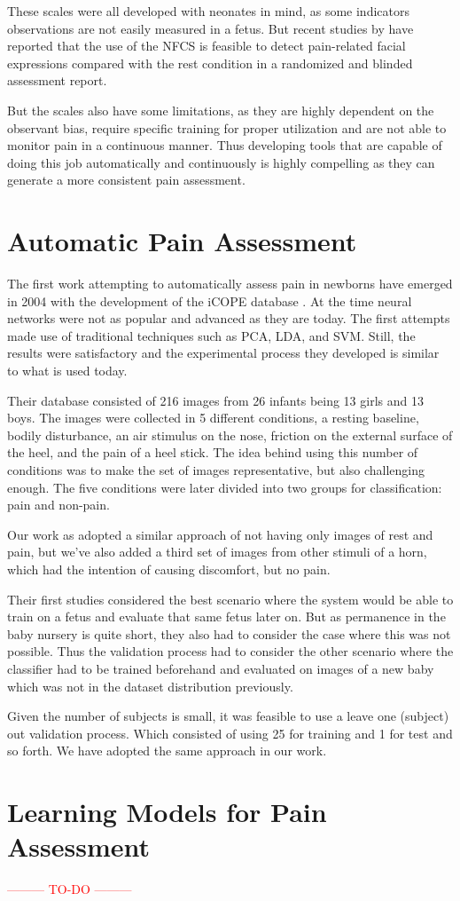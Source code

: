 These scales were all developed with neonates in mind, as some indicators observations are not easily measured in a fetus. But recent studies by \citeauthor{bernardes2018feasibility} have reported that the use of the NFCS is feasible to detect pain-related facial expressions compared with the rest condition in a randomized and blinded assessment report.

But the scales also have some limitations, as they are highly dependent on the observant bias, require specific training for proper utilization and are not able to monitor pain in a continuous manner. Thus developing tools that are capable of doing this job automatically and continuously is highly compelling as they can generate a more consistent pain assessment.

\section{Automatic Pain Assessment}

The first work attempting to automatically assess pain in newborns have emerged in 2004 with the development of the iCOPE database \citep{Brahnam2006}. At the time neural networks were not as popular and advanced as they are today. The first attempts made use of traditional techniques such as PCA, LDA, and SVM. Still, the results were satisfactory and the experimental process they developed is similar to what is used today. 

Their database consisted of 216 images from 26 infants being 13 girls and 13 boys. The images were collected in 5 different conditions, a resting baseline, bodily disturbance, an air stimulus on the nose, friction on the external surface of the heel, and the pain of a heel stick. The idea behind using this number of conditions was to make the set of images representative, but also challenging enough. The five conditions were later divided into two groups for classification: pain and non-pain.

Our work as adopted a similar approach of not having only images of rest and pain, but we've also added a third set of images from other stimuli of a horn, which had the intention of causing discomfort, but no pain. 

Their first studies considered the best scenario where the system would be able to train on a fetus and evaluate that same fetus later on. But as permanence in the baby nursery is quite short, they also had to consider the case where this was not possible. Thus the validation process had to consider the other scenario where the classifier had to be trained beforehand and evaluated on images of a new baby which was not in the dataset distribution previously.

Given the number of subjects is small, it was feasible to use a leave one (subject) out validation process. Which consisted of using 25 for training and 1 for test and so forth. We have adopted the same approach in our work.

\section{Learning Models for Pain Assessment}

\textcolor{red}{--------- TO-DO ---------}